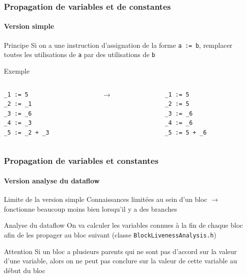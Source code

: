 \documentclass{beamer}
\begin{document}
\begin{frame}[fragile]
    \frametitle{Propagation de variables et de constantes}
    \framesubtitle{Version simple}

    \begin{block}{Principe}
        Si on a une instruction d'assignation de la forme \lstinline{a := b}, remplacer
        toutes les utilisations de \lstinline{a} par des utilisations de \lstinline{b}
    \end{block}
    \pause
    \begin{exampleblock}{Exemple}
         \begin{columns}
            \begin{column}{.40\textwidth}
                    \begin{lstlisting}
_1 := 5
_2 := _1
_3 := _6
_4 := _3
_5 := _2 + _3
                    \end{lstlisting}
            \end{column}
            \pause
            \begin{column}{.04\textwidth}
                $\rightarrow$
            \end{column}
            \begin{column}{.40\textwidth}
                    \begin{lstlisting}
_1 := 5
_2 := 5
_3 := _6
_4 := _6
_5 := 5 + _6
                    \end{lstlisting}
            \end{column}
        \end{columns}       
    \end{exampleblock}
\end{frame}
\begin{frame}
    \frametitle{Propagation de variables et constantes}
    \framesubtitle{Version analyse du dataflow}

    \begin{block}{Limite de la version simple}
        Connaissances limitées au sein d'un bloc $\rightarrow$ fonctionne beaucoup moins bien lorsqu'il y a des branches
    \end{block}
    \pause
    \begin{block}{Analyse du dataflow}
        On va calculer les variables connues à la fin de chaque bloc afin de les propager au bloc suivant (classe \lstinline{BlockLivenessAnalysis.h})
    \end{block}

    \pause
    \begin{alertblock}{Attention}
        Si un bloc a plusieurs parents qui ne sont pas d'accord sur la valeur d'une variable,
        alors on ne peut pas conclure sur la valeur de cette variable au début du bloc
    \end{alertblock}
    
\end{frame}
\end{document}
